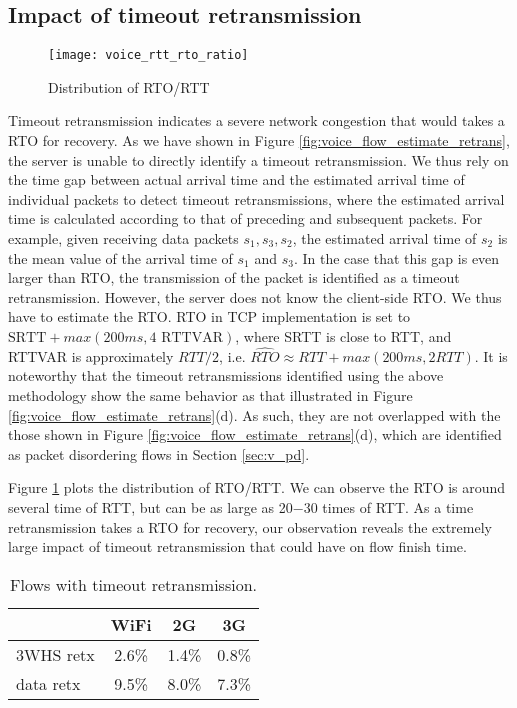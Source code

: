 \subsection{Impact of timeout retransmission}\label{sec:v_rto}

\begin{figure}[th]
\centering
	\texttt{[image: voice\_rtt\_rto\_ratio]}
\caption{Distribution of RTO/RTT}
\label{fig:rto_rtt}
\end{figure}

Timeout retransmission indicates a severe network congestion that would takes a RTO for recovery. As we have shown in Figure  \ref{fig:voice_flow_estimate_retrans}, the server is unable to directly identify a timeout retransmission. We thus rely on the time gap between actual arrival time and the estimated arrival time of individual packets to detect timeout retransmissions, where the estimated arrival time is calculated according to that of preceding and subsequent packets. For example, given receiving data packets $s_1, s_3, s_2$, the estimated arrival time of $s_2$ is the mean value of the arrival time of $s_1$ and $s_3$. In the case that this gap is even larger than RTO, the transmission of the packet is identified as a timeout retransmission. However, the server does not know the client-side RTO. We thus have to estimate the RTO. RTO in TCP implementation is set to $\text{SRTT} + max(200ms, 4 \text{ RTTVAR})$\cite{rfc62982011computing}, where SRTT is close to RTT, and RTTVAR is approximately $RTT/2$, i.e. $\widehat{RTO} \approx RTT + max(200ms, 2 RTT)$. It is noteworthy that the timeout retransmissions identified using the above methodology show the same behavior as that illustrated in Figure \ref{fig:voice_flow_estimate_retrans}(d). As such, they are not overlapped with the those shown in Figure \ref{fig:voice_flow_estimate_retrans}(d), which are identified as packet disordering flows in Section \ref{sec:v_pd}.

Figure \ref{fig:rto_rtt} plots the distribution of RTO/RTT. We can observe the RTO is around several time of RTT, but can be as large as 20$-$30 times of RTT. As a time retransmission takes a RTO for recovery, our observation reveals the extremely large impact of timeout retransmission that could have on flow finish time.

\begin{table}[th]
\centering
\renewcommand{\arraystretch}{1.1}
\caption{Flows with timeout retransmission.}
\label{tab:voice_stats}
\begin{tabular}{l|c|c|c}
	\toprule
	 & WiFi & 2G & 3G \\
	\midrule
	3WHS retx & 2.6\% & 1.4\% & 0.8\% \\
	\hline
	data retx & 9.5\% & 8.0\% & 7.3\% \\
	\bottomrule
\end{tabular}
\end{table}

